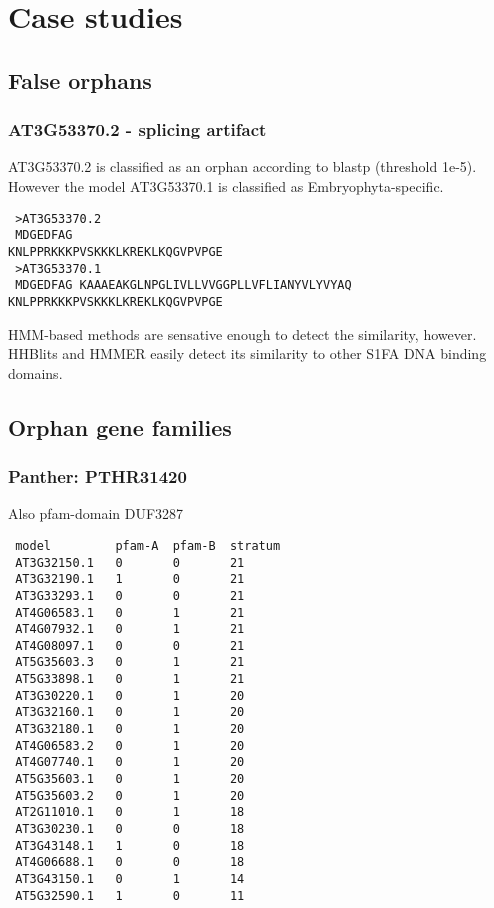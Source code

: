 \section{Case studies}

\subsection{False orphans}

\subsubsection{AT3G53370.2 - splicing artifact}

AT3G53370.2 is classified as an orphan according to blastp (threshold 1e-5).
However the model AT3G53370.1 is classified as Embryophyta-specific.

\begin{verbatim}
 >AT3G53370.2
 MDGEDFAG                                        KNLPPRKKKPVSKKKLKREKLKQGVPVPGE
 >AT3G53370.1
 MDGEDFAG KAAAEAKGLNPGLIVLLVVGGPLLVFLIANYVLYVYAQ KNLPPRKKKPVSKKKLKREKLKQGVPVPGE
\end{verbatim}

HMM-based methods are sensative enough to detect the similarity, however.
HHBlits and HMMER easily detect its similarity to other S1FA DNA binding
domains.

\subsection{Orphan gene families}

\subsubsection{Panther: PTHR31420}

Also pfam-domain DUF3287

\begin{verbatim}
 model         pfam-A  pfam-B  stratum
 AT3G32150.1   0       0       21     
 AT3G32190.1   1       0       21     
 AT3G33293.1   0       0       21     
 AT4G06583.1   0       1       21     
 AT4G07932.1   0       1       21     
 AT4G08097.1   0       0       21     
 AT5G35603.3   0       1       21     
 AT5G33898.1   0       1       21     
 AT3G30220.1   0       1       20     
 AT3G32160.1   0       1       20     
 AT3G32180.1   0       1       20     
 AT4G06583.2   0       1       20     
 AT4G07740.1   0       1       20     
 AT5G35603.1   0       1       20     
 AT5G35603.2   0       1       20     
 AT2G11010.1   0       1       18     
 AT3G30230.1   0       0       18     
 AT3G43148.1   1       0       18     
 AT4G06688.1   0       0       18     
 AT3G43150.1   0       1       14     
 AT5G32590.1   1       0       11     
\end{verbatim}
